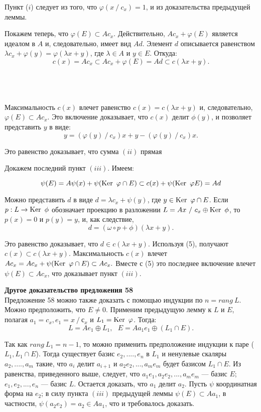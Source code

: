 \begin{myproof}
\noindent Пункт ($i$) следует из того, что $\varphi(x~/~c_x) = 1$, и из доказательства предыдущей леммы.

\noindent Покажем теперь, что $\varphi(E) \subset Ac_x$. Действительно, $Ac_x + \varphi(E)$ является идеалом в $A$ и, следовательно, имеет вид $Ad$. Элемент $d$ описывается равенством $\lambda c_x + \varphi(y) = \varphi(\lambda x + y)$, где $ \lambda \in A$ и $ y \in E $. Откуда:\\
$$ c(x) = Ac_x \subset Ac_x + \varphi(E) = Ad \subset c(\lambda x + y).$$

\noindent\\\\\\ Максимальность $c(x)$ влечет равенство $c(x) = c(\lambda x +y)$ и, следовательно, $ \varphi(E) \subset Ac_x$. Это включение доказывает, что $c(x)$ делит $\phi(y)$, и позволяет представить $y$ в виде:
$$ y = (\varphi(y)~/~c_x)x + y - (\varphi(y)~/~ c_x)x. $$

\noindent Это равенство доказывает, что сумма $(ii)$ прямая

\noindent Докажем последний пункт $(iii)$. Имеем:

$$ \psi(E) = A \psi(x) + \psi(\operatorname{Ker}~\varphi \cap E) \subset c(x) + \psi(\operatorname{Ker}~\varphi E) = Ad $$

\noindent Можно представить $d$ в виде $d = \lambda c_x + \psi(y)$, где $ y \in \operatorname{Ker}~\varphi \cap E$. Если $p: L \rightarrow \operatorname{Ker}~\phi$ обозначает проекцию в разложении $L = Ax ~/~ c_x \oplus \operatorname{Ker}~\phi$,
то $p(x) = 0$ и $p(y) = y$, и, как следствие,
$$ d = (\omega \circ p + \phi) (\lambda x + y). $$

\noindent Это равенство доказывает, что $d \in c(\lambda x + y)$. Используя (5), получают $c(x) \subset c(\lambda x + y)$. Максимальность $c(x)$ влечет $Ac_x = Ac_x + \psi(\operatorname{Ker}~ \varphi \cap E) \subset Ac_x.$ Вместе с (5) это последнее включение влечет $\psi(E) \subset Ac_x$, что доказывает пункт $(iii)$.
\end{myproof}
\noindent\textbf{Другое доказательство предложения 58}\\

Предложение 58 можно также доказать с помощью индукции по $n = rang~L$. Можно предположить, что $E \ne 0$. Применим предыдущую лемму к $L$ и $E$, полагая $a_1 = c_x, e_1 = x ~/~ с_x$ и $ L_1 = \operatorname{Ker}~\varphi$. Тогда:
$$ L = Ae_1 \oplus L_1,~~~ E = Aa_1e_1 \oplus (L_1 \cap E).$$

\noindent Так как $rang~L_1 = n -1$, то можно применить предположение индукции к паре ($L_1, L_1 \cap E$). Тогда существует базис $e_2, ....,e_n$ в $L_1$ и ненулевые скаляры  $a_2, ....,a_m$ такие, что $a_i$ делит $a_{i+1}$ и $a_2e_2,..., a_m e_m$ будет базисом $L_1 \cap E$. Из равенства, приведенного выше, следует, что $a_1 e_1, a_2 e_2, ..., a_m e_m$ — базис $E$; $e_1, e_2, ..., e_n$ — базис $L$. Остается доказать, что $a_1$ делит $a_2$. Пусть $\psi$ координатная форма на $e_2$; в силу пункта $(iii)$ предыдущей леммы $\psi(E) \subset Aa_1$, в частности, $\psi(a_2 e_2) = a_2 \in Aa_1$, что и требовалось доказать.

